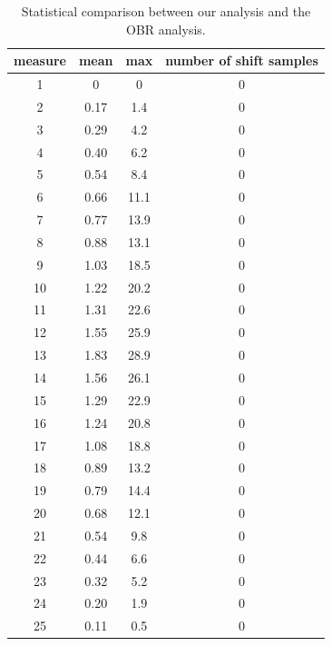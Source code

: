 \begin{table}[h]
\centering
 \begin{tabular}{c|c|c|c}
    measure & mean & max & number of shift samples\\
    \hline
		1 &  0    & 0     & 0 \\
	  2 &  0.17 &  1.4  & 0 \\
	  3 &  0.29 &  4.2  & 0 \\
	  4 &  0.40 &  6.2  & 0 \\
	  5 &  0.54 &  8.4  & 0 \\
	  6 &  0.66 & 11.1  & 0 \\
	  7 &  0.77 & 13.9  & 0 \\
	  8 &  0.88 & 13.1  & 0 \\
	  9 &  1.03 & 18.5  & 0 \\
	 10 &  1.22 & 20.2  & 0 \\
	 11 &  1.31 & 22.6  & 0 \\
	 12 &  1.55 & 25.9  & 0 \\
	 13 &  1.83 & 28.9  & 0 \\
	 14 &  1.56 & 26.1  & 0 \\
	 15 &  1.29 & 22.9  & 0 \\
	 16 &  1.24 & 20.8  & 0 \\
	 17 &  1.08 & 18.8  & 0 \\
	 18 &  0.89 & 13.2  & 0 \\
	 19 &  0.79 & 14.4  & 0 \\
	 20 &  0.68 & 12.1  & 0 \\
	 21 &  0.54 &  9.8  & 0 \\
	 22 &  0.44 &  6.6  & 0 \\
	 23 &  0.32 &  5.2  & 0 \\
	 24 &  0.20 &  1.9  & 0 \\
	 25 &  0.11 &  0.5  & 0 \\
 \end{tabular}
\caption{Statistical comparison between our analysis and the OBR analysis.}
 \label{table:difference}
\end{table}
